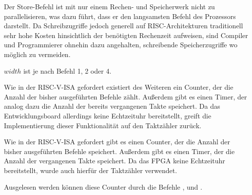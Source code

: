 
Der Store-Befehl ist mit nur einem Rechen- und Speicherwerk nicht zu
parallelisieren, was dazu f\"uhrt, dass er den langsamsten Befehl des
Prozessors darstellt. Da Schreibzugriffe jedoch generell auf
RISC-Architekturen traditionell sehr hohe Kosten hinsichtlich der
ben\"otigten Rechenzeit aufweisen, sind Compiler und Programmierer
ohnehin dazu angehalten, schreibende Speicherzugriffe wo m\"oglich zu
vermeiden.

{\(width\) ist je nach Befehl 1, 2 oder 4.
}

Wie in der RISC-V-ISA gefordert existiert des Weiteren ein Counter, der die
Anzahl der bisher ausgef\"uhrten Befehle z\"ahlt. Au\ss{}erdem gibt es einen
Timer, der analog dazu die Anzahl der bereits vergangenen Takte speichert. Da
das Entwicklungsboard allerdings keine Echtzeituhr bereitstellt, greift die
Implementierung dieser Funktionalit\"at auf den Taktz\"ahler zur\"uck.

Wie in der RISC-V-ISA gefordert gibt es einen Counter, der die Anzahl der
bisher ausgef\"uhrten Befehle speichert. Au\ss{}erdem gibt es einen Timer, der
die Anzahl der vergangenen Takte speichert. Da das FPGA keine Echtzeituhr
bereitstellt, wurde auch hierf\"ur der Taktz\"ahler verwendet.

Ausgelesen werden k\"onnen diese Counter durch die Befehle
\nolinebreak{},  und .

